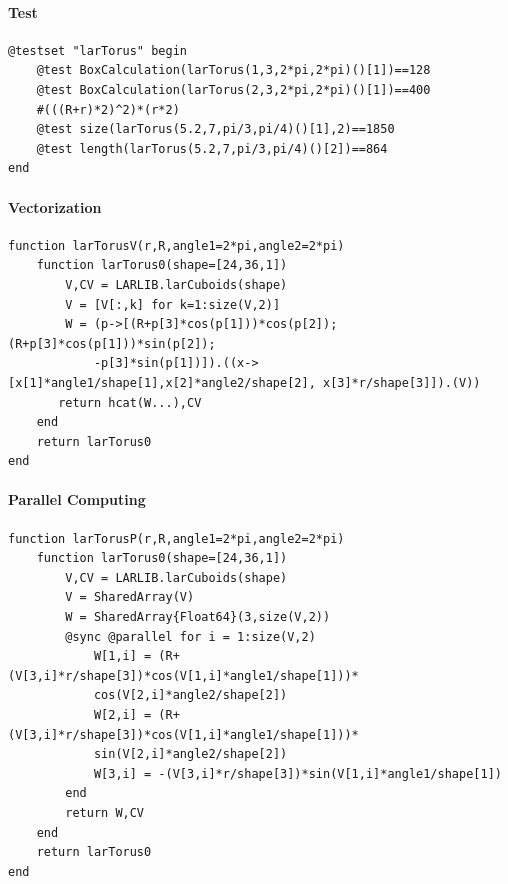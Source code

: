 \documentclass{article}
\begin{document}
\paragraph{Test}
\begin{Verbatim}
@testset "larTorus" begin
	@test BoxCalculation(larTorus(1,3,2*pi,2*pi)()[1])==128
	@test BoxCalculation(larTorus(2,3,2*pi,2*pi)()[1])==400
	#(((R+r)*2)^2)*(r*2)
	@test size(larTorus(5.2,7,pi/3,pi/4)()[1],2)==1850
	@test length(larTorus(5.2,7,pi/3,pi/4)()[2])==864
end
\end{Verbatim}

\paragraph{Vectorization}

\begin{verbatim}
function larTorusV(r,R,angle1=2*pi,angle2=2*pi)
    function larTorus0(shape=[24,36,1])
        V,CV = LARLIB.larCuboids(shape)
        V = [V[:,k] for k=1:size(V,2)]
        W = (p->[(R+p[3]*cos(p[1]))*cos(p[2]);(R+p[3]*cos(p[1]))*sin(p[2]);
            -p[3]*sin(p[1])]).((x->[x[1]*angle1/shape[1],x[2]*angle2/shape[2], x[3]*r/shape[3]]).(V))
       return hcat(W...),CV
    end
    return larTorus0
end
\end{verbatim}

\paragraph{Parallel Computing}
\begin{Verbatim}
function larTorusP(r,R,angle1=2*pi,angle2=2*pi)
    function larTorus0(shape=[24,36,1])
        V,CV = LARLIB.larCuboids(shape)
        V = SharedArray(V)
        W = SharedArray{Float64}(3,size(V,2))           
        @sync @parallel for i = 1:size(V,2)
            W[1,i] = (R+(V[3,i]*r/shape[3])*cos(V[1,i]*angle1/shape[1]))*
            cos(V[2,i]*angle2/shape[2])       
            W[2,i] = (R+(V[3,i]*r/shape[3])*cos(V[1,i]*angle1/shape[1]))*
            sin(V[2,i]*angle2/shape[2])
            W[3,i] = -(V[3,i]*r/shape[3])*sin(V[1,i]*angle1/shape[1])
        end
        return W,CV
    end
    return larTorus0
end 
\end{Verbatim}
\end{document}
